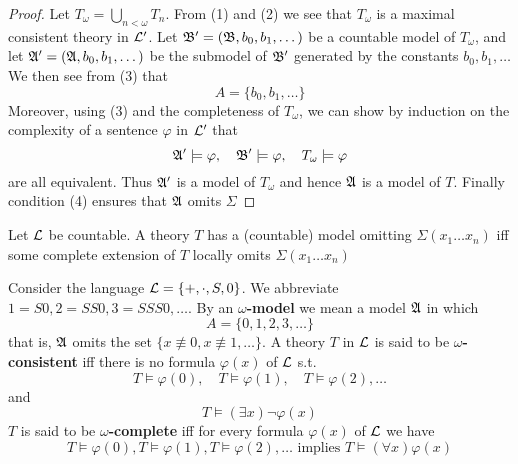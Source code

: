 \documentclass[11pt]{article}
\begin{document}
\begin{proof}
Let \(T_\omega=\bigcup_{n<\omega}T_n\). From (1) and (2) we see that \(T_\omega\)
is a maximal consistent theory in \(\mathcal{L}'\). Let
\(\mathfrak{B}'=(\mathfrak{B},b_0,b_1,\dots)\) be a countable model of \(T_\omega\), and let
\(\mathfrak{A}'=(\mathfrak{A},b_0,b_1,\dots)\) be the submodel of \(\mathfrak{B}'\) generated by the
constants \(b_0,b_1,\dots\) We then see from (3) that
\begin{equation*}
A=\{b_0,b_1,\dots\}
\end{equation*}
Moreover, using (3) and the completeness of \(T_\omega\), we can show by
induction on the complexity of a sentence \(\varphi\) in \(\mathcal{L}'\) that
\begin{equation*}
\mathfrak{A}'\models\varphi,\quad\mathfrak{B}'\models\varphi,\quad T_\omega\models\varphi
\end{equation*}
are all equivalent. Thus \(\mathfrak{A}'\) is a model of \(T_\omega\) and hence
\(\mathfrak{A}\) is a model of \(T\). Finally condition (4) ensures that \(\mathfrak{A}\) omits \(\Sigma\)
\end{proof}

\begin{corollary}[]
Let \(\mathcal{L}\) be countable. A theory \(T\) has a (countable) model omitting
\(\Sigma(x_1\dots x_n)\) iff some complete extension of \(T\) locally omits
\(\Sigma(x_1\dots x_n)\)
\end{corollary}

\begin{examplle}[]
Consider the language \(\mathcal{L}=\{+,\cdot,S,0\}\). We abbreviate
\(1=S0,2=SS0,3=SSS0,\dots\). By an \textbf{\(\omega\)-model} we mean a model \(\mathfrak{A}\)
in which
\begin{equation*}
A=\{0,1,2,3,\dots\}
\end{equation*}
that is, \(\mathfrak{A}\) omits the set \(\{x\not\equiv0,x\not\equiv1,\dots\}\). A
theory \(T\) in \(\mathcal{L}\) is said to be \textbf{\(\omega\)-consistent} iff there is no
formula \(\varphi(x)\) of \(\mathcal{L}\) s.t.
\begin{equation*}
T\models\varphi(0),\quad T\models\varphi(1),\quad T\models\varphi(2),\dots
\end{equation*}
and
\begin{equation*}
T\models(\exists x)\neg\varphi(x)
\end{equation*}
\(T\) is said to be \textbf{\(\omega\)-complete} iff for every formula \(\varphi(x)\) of
\(\mathcal{L}\) we have
\begin{equation*}
T\models\varphi(0),T\models\varphi(1),T\models\varphi(2),\dots\text{ implies }
T\models(\forall x)\varphi(x)
\end{equation*}
\end{examplle}
\end{document}
